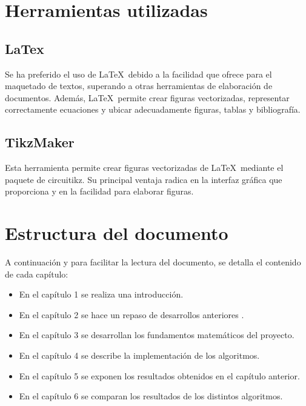 \section{Herramientas utilizadas}
\subsection{LaTex \cite{latex}} 
Se ha preferido el uso de \LaTeX\ debido a la facilidad que ofrece para el maquetado de textos, superando a otras herramientas de elaboración de documentos. Además, \LaTeX\ permite crear figuras vectorizadas, representar correctamente ecuaciones y ubicar adecuadamente figuras, tablas y bibliografía.
\subsection{TikzMaker \cite{tikzmaker}} 
Esta herramienta permite crear figuras vectorizadas de \LaTeX\ mediante el paquete de circuitikz. Su principal ventaja radica en la interfaz gráfica que proporciona y en la facilidad para elaborar figuras.


\section{Estructura del documento}
A continuación y para facilitar la lectura del documento, se detalla el contenido de cada capítulo:

\begin{itemize}
	\item En el capítulo 1 se realiza una introducción.
	\item En el capítulo 2 se hace un repaso de desarrollos anteriores .
	\item En el capítulo 3 se desarrollan los fundamentos matemáticos del proyecto.
	\item En el capítulo 4 se describe la implementación de los algoritmos.
	\item En el capítulo 5 se exponen los resultados obtenidos en el capítulo anterior. 
	\item En el capítulo 6 se comparan los resultados de los distintos algoritmos.
\end{itemize}